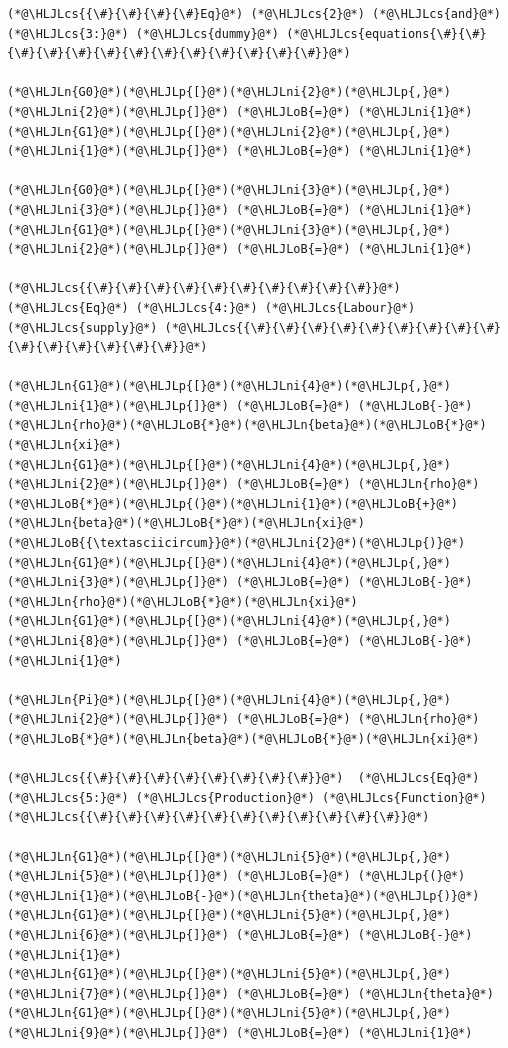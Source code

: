 \documentclass[12pt,a4paper]{article}
\newcommand{\HLJLn}[1]{#1}
\newcommand{\HLJLni}[1]{\textcolor[RGB]{59,151,46}{#1}}
\newcommand{\HLJLoB}[1]{\textcolor[RGB]{102,102,102}{\textbf{#1}}}
\newcommand{\HLJLp}[1]{#1}
\newcommand{\HLJLcs}[1]{\textcolor[RGB]{153,153,119}{\textit{#1}}}
\begin{document}
\begin{lstlisting}
(*@\HLJLcs{{\#}{\#}{\#}{\#}Eq}@*) (*@\HLJLcs{2}@*) (*@\HLJLcs{and}@*) (*@\HLJLcs{3:}@*) (*@\HLJLcs{dummy}@*) (*@\HLJLcs{equations{\#}{\#}{\#}{\#}{\#}{\#}{\#}{\#}{\#}{\#}{\#}{\#}{\#}}@*)

(*@\HLJLn{G0}@*)(*@\HLJLp{[}@*)(*@\HLJLni{2}@*)(*@\HLJLp{,}@*)(*@\HLJLni{2}@*)(*@\HLJLp{]}@*) (*@\HLJLoB{=}@*) (*@\HLJLni{1}@*)
(*@\HLJLn{G1}@*)(*@\HLJLp{[}@*)(*@\HLJLni{2}@*)(*@\HLJLp{,}@*)(*@\HLJLni{1}@*)(*@\HLJLp{]}@*) (*@\HLJLoB{=}@*) (*@\HLJLni{1}@*)

(*@\HLJLn{G0}@*)(*@\HLJLp{[}@*)(*@\HLJLni{3}@*)(*@\HLJLp{,}@*)(*@\HLJLni{3}@*)(*@\HLJLp{]}@*) (*@\HLJLoB{=}@*) (*@\HLJLni{1}@*)
(*@\HLJLn{G1}@*)(*@\HLJLp{[}@*)(*@\HLJLni{3}@*)(*@\HLJLp{,}@*)(*@\HLJLni{2}@*)(*@\HLJLp{]}@*) (*@\HLJLoB{=}@*) (*@\HLJLni{1}@*)

(*@\HLJLcs{{\#}{\#}{\#}{\#}{\#}{\#}{\#}{\#}{\#}{\#}}@*) (*@\HLJLcs{Eq}@*) (*@\HLJLcs{4:}@*) (*@\HLJLcs{Labour}@*) (*@\HLJLcs{supply}@*) (*@\HLJLcs{{\#}{\#}{\#}{\#}{\#}{\#}{\#}{\#}{\#}{\#}{\#}{\#}{\#}{\#}{\#}}@*)

(*@\HLJLn{G1}@*)(*@\HLJLp{[}@*)(*@\HLJLni{4}@*)(*@\HLJLp{,}@*)(*@\HLJLni{1}@*)(*@\HLJLp{]}@*) (*@\HLJLoB{=}@*) (*@\HLJLoB{-}@*)(*@\HLJLn{rho}@*)(*@\HLJLoB{*}@*)(*@\HLJLn{beta}@*)(*@\HLJLoB{*}@*)(*@\HLJLn{xi}@*)
(*@\HLJLn{G1}@*)(*@\HLJLp{[}@*)(*@\HLJLni{4}@*)(*@\HLJLp{,}@*)(*@\HLJLni{2}@*)(*@\HLJLp{]}@*) (*@\HLJLoB{=}@*) (*@\HLJLn{rho}@*)(*@\HLJLoB{*}@*)(*@\HLJLp{(}@*)(*@\HLJLni{1}@*)(*@\HLJLoB{+}@*)(*@\HLJLn{beta}@*)(*@\HLJLoB{*}@*)(*@\HLJLn{xi}@*)(*@\HLJLoB{{\textasciicircum}}@*)(*@\HLJLni{2}@*)(*@\HLJLp{)}@*)
(*@\HLJLn{G1}@*)(*@\HLJLp{[}@*)(*@\HLJLni{4}@*)(*@\HLJLp{,}@*)(*@\HLJLni{3}@*)(*@\HLJLp{]}@*) (*@\HLJLoB{=}@*) (*@\HLJLoB{-}@*)(*@\HLJLn{rho}@*)(*@\HLJLoB{*}@*)(*@\HLJLn{xi}@*)
(*@\HLJLn{G1}@*)(*@\HLJLp{[}@*)(*@\HLJLni{4}@*)(*@\HLJLp{,}@*)(*@\HLJLni{8}@*)(*@\HLJLp{]}@*) (*@\HLJLoB{=}@*) (*@\HLJLoB{-}@*)(*@\HLJLni{1}@*)

(*@\HLJLn{Pi}@*)(*@\HLJLp{[}@*)(*@\HLJLni{4}@*)(*@\HLJLp{,}@*)(*@\HLJLni{2}@*)(*@\HLJLp{]}@*) (*@\HLJLoB{=}@*) (*@\HLJLn{rho}@*)(*@\HLJLoB{*}@*)(*@\HLJLn{beta}@*)(*@\HLJLoB{*}@*)(*@\HLJLn{xi}@*)

(*@\HLJLcs{{\#}{\#}{\#}{\#}{\#}{\#}{\#}{\#}}@*)  (*@\HLJLcs{Eq}@*) (*@\HLJLcs{5:}@*) (*@\HLJLcs{Production}@*) (*@\HLJLcs{Function}@*) (*@\HLJLcs{{\#}{\#}{\#}{\#}{\#}{\#}{\#}{\#}{\#}{\#}{\#}}@*)

(*@\HLJLn{G1}@*)(*@\HLJLp{[}@*)(*@\HLJLni{5}@*)(*@\HLJLp{,}@*)(*@\HLJLni{5}@*)(*@\HLJLp{]}@*) (*@\HLJLoB{=}@*) (*@\HLJLp{(}@*)(*@\HLJLni{1}@*)(*@\HLJLoB{-}@*)(*@\HLJLn{theta}@*)(*@\HLJLp{)}@*)
(*@\HLJLn{G1}@*)(*@\HLJLp{[}@*)(*@\HLJLni{5}@*)(*@\HLJLp{,}@*)(*@\HLJLni{6}@*)(*@\HLJLp{]}@*) (*@\HLJLoB{=}@*) (*@\HLJLoB{-}@*)(*@\HLJLni{1}@*)
(*@\HLJLn{G1}@*)(*@\HLJLp{[}@*)(*@\HLJLni{5}@*)(*@\HLJLp{,}@*)(*@\HLJLni{7}@*)(*@\HLJLp{]}@*) (*@\HLJLoB{=}@*) (*@\HLJLn{theta}@*)
(*@\HLJLn{G1}@*)(*@\HLJLp{[}@*)(*@\HLJLni{5}@*)(*@\HLJLp{,}@*)(*@\HLJLni{9}@*)(*@\HLJLp{]}@*) (*@\HLJLoB{=}@*) (*@\HLJLni{1}@*)


\end{lstlisting}
\end{document}
